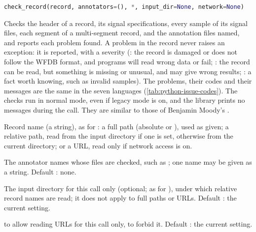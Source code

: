 \begin{lstlisting}[language=Python,style=signature]
check_record(record, annotators=(), *, input_dir=None, network=None)
\end{lstlisting}
Checks the header of a record, its signal specifications, every sample of its signal
files, each segment of a multi-segment record, and the annotation files named, and
reports each problem found. A problem in the record never raises an exception: it is
reported, with a severity (: the record is damaged or does not follow the
WFDB format, and programs will read wrong data or fail; : the record can
be read, but something is missing or unusual, and may give wrong results; :
a fact worth knowing, such as invalid samples). The problems, their codes and their
messages are the same in the seven languages (\cref{tab:python-issue-codes}). The checks
run in normal mode, even if legacy mode is on, and the library prints no messages during
the call. They are similar to those of Benjamin Moody's .
\begin{params}
\item[record] Record name (a string), as for : a full path (absolute or
  \code{\textasciitilde}), used as given; a relative path, read from the input directory
  if one is set, otherwise from the current directory; or a URL, read only if network
  access is on.
\item[annotators] The annotator names whose files are checked, such as \code{["atr"]}; one
  name may be given as a string. Default \code{()}: none.
\item[input\_dir] The input directory for this call only (optional; as for
  ), under which relative record names are read; it does not apply to
  full paths or URLs. Default : the current setting.
\item[network]  to allow reading URLs for this call only,  to forbid
  it. Default : the current setting.
\end{params}
